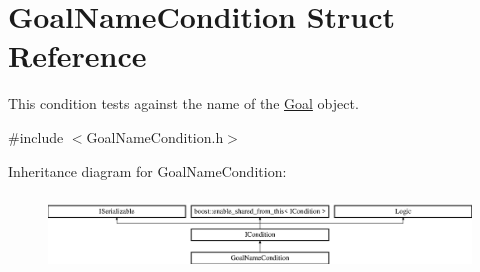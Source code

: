 \hypertarget{struct_goal_name_condition}{}\section{Goal\+Name\+Condition Struct Reference}
\label{struct_goal_name_condition}


This condition tests against the name of the \hyperlink{class_goal}{Goal} object.  




{\ttfamily \#include $<$Goal\+Name\+Condition.\+h$>$}

Inheritance diagram for Goal\+Name\+Condition\+:\begin{figure}[H]
\begin{center}
\leavevmode
\includegraphics[height=2.014389cm]{struct_goal_name_condition}
\end{center}
\end{figure}
